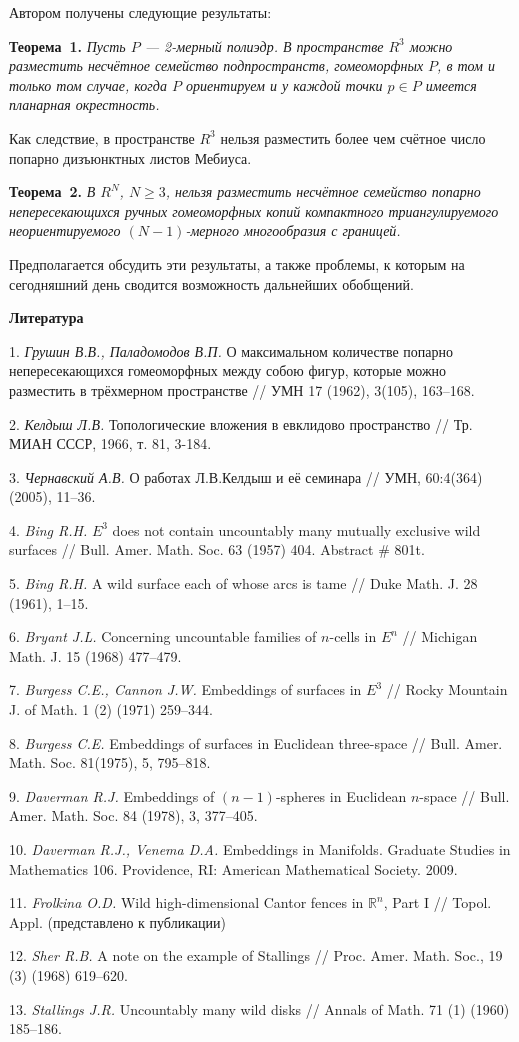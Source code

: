 Автором получены
следующие результаты:

\textbf{Теорема~1.}
{\it Пусть $P$ --- 2-мерный полиэдр.
В пространстве $R^3$ можно разместить несчётное
семейство подпространств, гомеоморфных $P$,
в том и только том случае, когда
$P$ ориентируем и у каждой точки
$p\in P$
имеется планарная окрестность.}

Как следствие, в пространстве $R^3$ нельзя разместить более чем счётное число
попарно дизъюнктных листов Мебиуса.

\textbf{Теорема~2.} {\it
В $R^N$, $N\geqslant 3$,
нельзя разместить несчётное семейство попарно непересекающихся
ручных гомеоморфных копий
компактного триангулируемого
неориентируемого $(N-1)$-мерного многообразия с границей.}

Предполагается обсудить эти результаты,
а также проблемы,
к которым
на сегодняшний день
сводится возможность дальнейших
обобщений.


\smallskip \centerline{\bf Литература}\nopagebreak

1.
{\it Грушин В.В., Паладомодов В.П.}
О максимальном количестве попарно непересекающихся гомеоморфных между собою фигур, которые можно разместить в трёхмерном пространстве
 // УМН 17 (1962), 3(105), 163--168.

2.
{\it Келдыш Л.В.}
Топологические вложения в евклидово пространство
// Тр. МИАН СССР, 1966,	 т. 81, 3-184.

3.
{\it Чернавский А.В.}
О работах Л.В.Келдыш и её семинара //
УМН, 60:4(364) (2005), 11–36.


4.
{\it Bing R.H.}
$E^3$ does not contain
uncountably many mutually exclusive wild
surfaces //
Bull. Amer. Math. Soc.
63 (1957) 404.
Abstract \# 801t.

5.
{\it Bing R.H.}
A wild surface each of whose arcs is tame //
Duke Math. J. 28 (1961), 1--15.

6.
{\it Bryant J.L.}
Concerning uncountable families of $n$-cells in $E^n$ //
Michigan Math. J. 15 (1968) 477--479.


7.
{\it Burgess C.E., Cannon J.W.}
Embeddings of surfaces in $E^3$ //
Rocky Mountain J. of Math.
1 (2) (1971) 259--344.

8.
{\it Burgess C.E.}
Embeddings of surfaces in Euclidean three-space //
Bull. Amer. Math. Soc.
81(1975), 5, 795--818.

9.
{\it Daverman R.J.}
Embeddings of $(n-1)$-spheres in
Euclidean $n$-space //
Bull. Amer. Math. Soc.
84 (1978), 3, 377--405.

10.
{\it Daverman R.J., Venema D.A.}
Embeddings in Manifolds.
Graduate Studies in Mathematics 106. Providence, RI: American Mathematical Society.
2009.

11.
{\it Frolkina O.D.}
Wild high-dimensional Cantor fences in $\mathbb R^n$, Part I // Topol. Appl.
\foreignlanguage{russian}{
	(представлено к публикации)
}

12.
{\it Sher R.B.}
A note on the example of Stallings //
Proc. Amer. Math. Soc., 19 (3) (1968) 619--620.

13.
{\it Stallings J.R.}
Uncountably many wild disks //
Annals of Math. 71 (1) (1960) 185--186.

